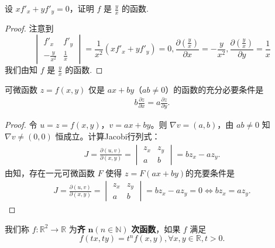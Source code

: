 \documentclass[../../main.tex]{subfiles}%
\begin{document}
\begin{example}
设 \( x f'_x + y f'_y = 0 \)，证明 \( f \) 是 \( \frac{y}{x} \) 的函数.
\end{example}
\begin{proof}
注意到
\[
\begin{vmatrix}
f'_x & f'_y \\
-\frac{y}{x^2} & \frac{1}{x}
\end{vmatrix} = \frac{1}{x^2} \left( x f'_x + y f'_y \right) = 0, \frac{\partial \left( \frac{y}{x} \right)}{\partial x} = -\frac{y}{x^2}, \frac{\partial \left( \frac{y}{x} \right)}{\partial y} = \frac{1}{x}
\]
我们由知 \( f \) 是 \( \frac{y}{x} \) 的函数.
\end{proof}

\begin{example}
可微函数 $z = f(x, y)$ 仅是 $ax + by$（$ab \neq 0$）的函数的充分必要条件是
\begin{align*}
b \frac{\partial z}{\partial x} = a \frac{\partial z}{\partial y}.
\end{align*}
\end{example}
\begin{proof}
令 $u = z = f(x, y)$，$v = ax + by$。则 $\nabla v = (a, b)$，由 $ab \neq 0$ 知 $\nabla v \neq (0,0)$ 恒成立。计算Jacobi行列式：
\begin{align*}
J = \frac{\partial (u, v)}{\partial (x, y)}
= \begin{vmatrix}
z_x & z_y \\
a & b
\end{vmatrix}
= b z_x - a z_y.
\end{align*}
由知，存在一元可微函数 $F$ 使得 $z = F(ax+by)$的充要条件是
\begin{align*}
J = \frac{\partial (u, v)}{\partial (x, y)}
= \begin{vmatrix}
z_x & z_y \\
a & b
\end{vmatrix}
= b z_x - a z_y=0\iff b z_x = a z_y.
\end{align*}
\end{proof}

\begin{definition}
我们称 \( f : \mathbb{R}^2 \to \mathbb{R} \) 为\textbf{齐} \( \boldsymbol{n}( n \in \mathbb{N} )\) \textbf{次函数}，如果 \( f \) 满足
\[
f(tx, ty) = t^n f(x, y), \forall x, y \in \mathbb{R}, t > 0.
\]
\end{definition}
\end{document}
